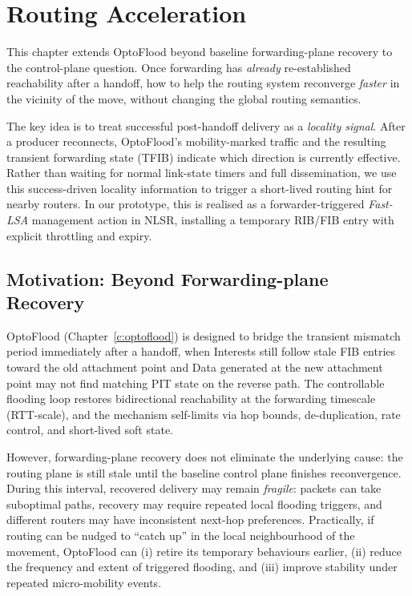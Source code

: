 \chapter{Routing Acceleration}
\label{c:routing_acceleration}

This chapter extends OptoFlood beyond baseline forwarding-plane recovery to the
control-plane question. Once forwarding has \emph{already} re-established reachability after a handoff, how to help the routing system reconverge \emph{faster} in the vicinity of the move, without changing the global routing semantics.

The key idea is to treat successful post-handoff delivery as a \emph{locality signal}. After a producer reconnects, OptoFlood’s mobility-marked traffic and the resulting transient forwarding state (TFIB) indicate which direction is currently effective. Rather than waiting for normal link-state timers and full dissemination, we use this success-driven locality information to trigger a short-lived routing hint for nearby routers. In our prototype, this is realised as a forwarder-triggered \emph{Fast-LSA} management action in NLSR, installing a temporary RIB/FIB entry with explicit throttling and expiry.


\section{Motivation: Beyond Forwarding-plane Recovery}
\label{sec:routing_acceleration:motivation_beyond_forwarding-plane_recovery}

OptoFlood (Chapter~\ref{c:optoflood}) is designed to bridge the transient mismatch period immediately after a handoff, when Interests still follow stale FIB entries toward the old attachment point and Data generated at the new attachment point may not find matching PIT state on the reverse path. The controllable flooding loop restores bidirectional reachability at the forwarding timescale (RTT-scale), and the mechanism self-limits via hop bounds, de-duplication, rate control, and short-lived soft state.

However, forwarding-plane recovery does not eliminate the underlying cause: the routing plane is still stale until the baseline control plane finishes reconvergence. During this interval, recovered delivery may remain \emph{fragile}: packets can take suboptimal paths, recovery may require repeated local flooding triggers, and different routers may have inconsistent next-hop preferences. Practically, if routing can be nudged to “catch up” in the local neighbourhood of the movement, OptoFlood can (i) retire its temporary behaviours earlier, (ii) reduce the frequency and extent of triggered flooding, and (iii) improve stability under repeated micro-mobility events.

